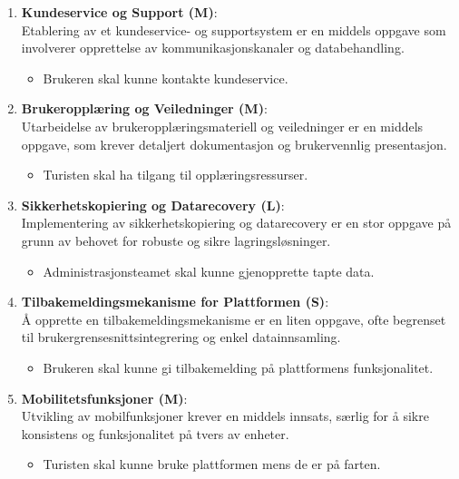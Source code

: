 \documentclass[../doc.tex]{subfiles}
\begin{document}
\begin{enumerate}
    \item \textbf{Kundeservice og Support (M)}: \\
    Etablering av et kundeservice- og supportsystem er en middels oppgave som involverer opprettelse av kommunikasjonskanaler og databehandling.
    \begin{itemize}
        \item Brukeren skal kunne kontakte kundeservice.
    \end{itemize}

    \item \textbf{Brukeropplæring og Veiledninger (M)}: \\
    Utarbeidelse av brukeropplæringsmateriell og veiledninger er en middels oppgave, som krever detaljert dokumentasjon og brukervennlig presentasjon.
    \begin{itemize}
        \item Turisten skal ha tilgang til opplæringsressurser.
    \end{itemize}

    \item \textbf{Sikkerhetskopiering og Datarecovery (L)}: \\
    Implementering av sikkerhetskopiering og datarecovery er en stor oppgave på grunn av behovet for robuste og sikre lagringsløsninger.
    \begin{itemize}
        \item Administrasjonsteamet skal kunne gjenopprette tapte data.
    \end{itemize}

    \item \textbf{Tilbakemeldingsmekanisme for Plattformen (S)}: \\
    Å opprette en tilbakemeldingsmekanisme er en liten oppgave, ofte begrenset til brukergrensesnittsintegrering og enkel datainnsamling.
    \begin{itemize}
        \item Brukeren skal kunne gi tilbakemelding på plattformens funksjonalitet.
    \end{itemize}

    \item \textbf{Mobilitetsfunksjoner (M)}: \\
    Utvikling av mobilfunksjoner krever en middels innsats, særlig for å sikre konsistens og funksjonalitet på tvers av enheter.
    \begin{itemize}
        \item Turisten skal kunne bruke plattformen mens de er på farten.
    \end{itemize}


\end{enumerate}
\end{document}
